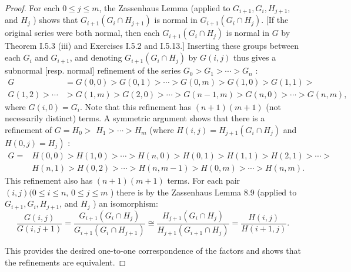 \begin{theorem}[Schreier]
\begin{proof}
        For each $0 \leq j \leq m$, the Zassenhaus Lemma (applied to $G_{i+1}, G_i, H_{j+1}$, and $H_j$ ) shows that $G_{i+1}\left(G_i \cap H_{j+1}\right)$ is normal in $G_{i+1}\left(G_i \cap H_j\right)$. [If the original series were both normal, then each $G_{i+1}\left(G_i \cap H_j\right)$ is normal in $G$ by Theorem I.5.3 (iii) and Exercises I.5.2 and I.5.13.] Inserting these groups between each $G_i$ and $G_{i+1}$, and denoting $G_{i+1}\left(G_i \cap H_j\right)$ by $G(i, j)$ thus gives a subnormal [resp. normal] refinement of the series $G_0>G_1>\cdots>G_n$ :
        \begin{equation*}
            \begin{aligned}
                G             & =G(0,0)>G(0,1)>\cdots>G(0, m)>G(1,0)>G(1,1)>             \\
                G(1,2)>\cdots & >G(1, m)>G(2,0)>\cdots>G(n-1, m)>G(n, 0)>\cdots>G(n, m),
            \end{aligned}
        \end{equation*}
        where $G(i, 0)=G_i$. Note that this refinement has $(n+1)(m+1)$ (not necessarily distinct) terms. A symmetric argument shows that there is a refinement of $G=H_0>$ $H_1>\cdots>H_m$ (where $H(i, j)=H_{j+1}\left(G_i \cap H_j\right)$ and $\left.H(0, j)=H_j\right)$ :
        \begin{equation*}
            \begin{aligned}
                G= & H(0,0)>H(1,0)>\cdots>H(n, 0)>H(0,1)>H(1,1)>H(2,1)>\cdots> \\
                   & H(n, 1)>H(0,2)>\cdots>H(n, m-1)>H(0, m)>\cdots>H(n, m) .
            \end{aligned}
        \end{equation*}
        This refinement also has $(n+1)(m+1)$ terms. For each pair $(i, j)(0 \leq i \leq n$, $0 \leq j \leq m$ ) there is by the Zassenhaus Lemma 8.9 (applied to $G_{i+1}, G_i, H_{j+1}$, and $H_j$ ) an isomorphism:
        \begin{equation*}
            \frac{G(i, j)}{G(i, j+1)}=\frac{G_{i+1}\left(G_i \cap H_j\right)}{G_{i+1}\left(G_i \cap H_{j+1}\right)} \cong \frac{H_{j+1}\left(G_i \cap H_j\right)}{H_{j+1}\left(G_{i+1} \cap H_j\right)}=\frac{H(i, j)}{H(i+1, j)} .
        \end{equation*}

        This provides the desired one-to-one correspondence of the factors and shows that the refinements are equivalent.
    \end{proof}
\end{theorem}

